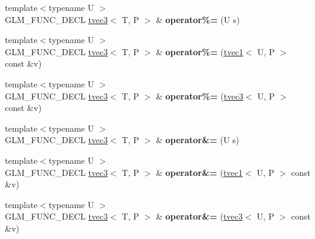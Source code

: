 \begin{DoxyCompactItemize}
\item 
\hypertarget{structglm_1_1tvec3_a4aa5ab58da32eaeded4b0e438d758ad0}{{\footnotesize template$<$typename U $>$ }\\G\-L\-M\-\_\-\-F\-U\-N\-C\-\_\-\-D\-E\-C\-L \hyperlink{structglm_1_1tvec3}{tvec3}$<$ T, P $>$ \& {\bfseries operator\%=} (U s)}\label{structglm_1_1tvec3_a4aa5ab58da32eaeded4b0e438d758ad0}

\item 
\hypertarget{structglm_1_1tvec3_a4bad68930d445ca78624dee131d95e15}{{\footnotesize template$<$typename U $>$ }\\G\-L\-M\-\_\-\-F\-U\-N\-C\-\_\-\-D\-E\-C\-L \hyperlink{structglm_1_1tvec3}{tvec3}$<$ T, P $>$ \& {\bfseries operator\%=} (\hyperlink{structglm_1_1tvec1}{tvec1}$<$ U, P $>$ const \&v)}\label{structglm_1_1tvec3_a4bad68930d445ca78624dee131d95e15}

\item 
\hypertarget{structglm_1_1tvec3_abb9bf8c109aa14bc40356f31eba946b0}{{\footnotesize template$<$typename U $>$ }\\G\-L\-M\-\_\-\-F\-U\-N\-C\-\_\-\-D\-E\-C\-L \hyperlink{structglm_1_1tvec3}{tvec3}$<$ T, P $>$ \& {\bfseries operator\%=} (\hyperlink{structglm_1_1tvec3}{tvec3}$<$ U, P $>$ const \&v)}\label{structglm_1_1tvec3_abb9bf8c109aa14bc40356f31eba946b0}

\item 
\hypertarget{structglm_1_1tvec3_af9c1c2159ca211c135ba93a0efc82379}{{\footnotesize template$<$typename U $>$ }\\G\-L\-M\-\_\-\-F\-U\-N\-C\-\_\-\-D\-E\-C\-L \hyperlink{structglm_1_1tvec3}{tvec3}$<$ T, P $>$ \& {\bfseries operator\&=} (U s)}\label{structglm_1_1tvec3_af9c1c2159ca211c135ba93a0efc82379}

\item 
\hypertarget{structglm_1_1tvec3_ad5a0fe7dd37fff314dd01d79887f02be}{{\footnotesize template$<$typename U $>$ }\\G\-L\-M\-\_\-\-F\-U\-N\-C\-\_\-\-D\-E\-C\-L \hyperlink{structglm_1_1tvec3}{tvec3}$<$ T, P $>$ \& {\bfseries operator\&=} (\hyperlink{structglm_1_1tvec1}{tvec1}$<$ U, P $>$ const \&v)}\label{structglm_1_1tvec3_ad5a0fe7dd37fff314dd01d79887f02be}

\item 
\hypertarget{structglm_1_1tvec3_aca1630f439ac6a204ed15f3513c057b1}{{\footnotesize template$<$typename U $>$ }\\G\-L\-M\-\_\-\-F\-U\-N\-C\-\_\-\-D\-E\-C\-L \hyperlink{structglm_1_1tvec3}{tvec3}$<$ T, P $>$ \& {\bfseries operator\&=} (\hyperlink{structglm_1_1tvec3}{tvec3}$<$ U, P $>$ const \&v)}\label{structglm_1_1tvec3_aca1630f439ac6a204ed15f3513c057b1}


\end{DoxyCompactItemize}
